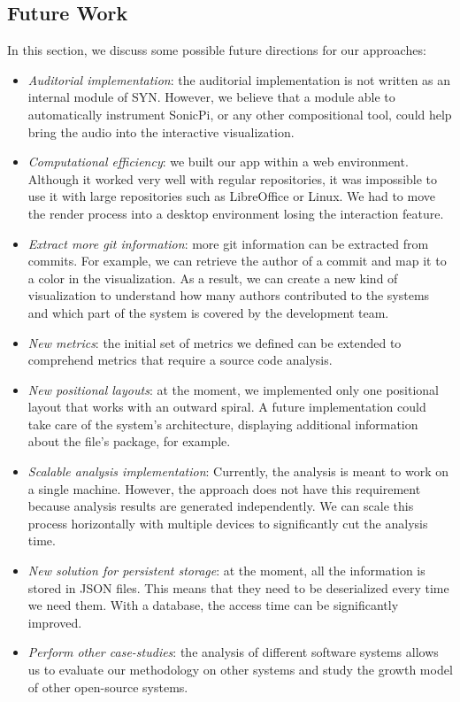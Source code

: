 \subsection*{Future Work}
In this section, we discuss some possible future directions for our approaches:
\begin{itemize}
    \item \textit{Auditorial implementation}: the auditorial implementation is not written as an internal module of SYN. However, we believe that a module able to automatically instrument SonicPi, or any other compositional tool, could help bring the audio into the interactive visualization. 
    \item \textit{Computational efficiency}: we built our app within a web environment. Although it worked very well with regular repositories, it was impossible to use it with large repositories such as LibreOffice or Linux. We had to move the render process into a desktop environment losing the interaction feature.
    \item \textit{Extract more git information}: more git information can be extracted from commits. For example, we can retrieve the author of a commit and map it to a color in the visualization. As a result, we can create a new kind of visualization to understand how many authors contributed to the systems and which part of the system is covered by the development team. 
    \item \textit{New metrics}: the initial set of metrics we defined can be extended to comprehend metrics that require a source code analysis.
    \item \textit{New positional layouts}: at the moment, we implemented only one positional layout that works with an outward spiral. A future implementation could take care of the system's architecture, displaying additional information about the file's package, for example.
    \item \textit{Scalable analysis implementation}: Currently, the analysis is meant to work on a single machine. However, the approach does not have this requirement because analysis results are generated independently. We can scale this process horizontally with multiple devices to significantly cut the analysis time. 
    \item \textit{New solution for persistent storage}: at the moment, all the information is stored in JSON files. This means that they need to be deserialized every time we need them. With a database, the access time can be significantly improved.
    \item \textit{Perform other case-studies}: the analysis of different software systems allows us to evaluate our methodology on other systems and study the growth model of other open-source systems. 
\end{itemize}


